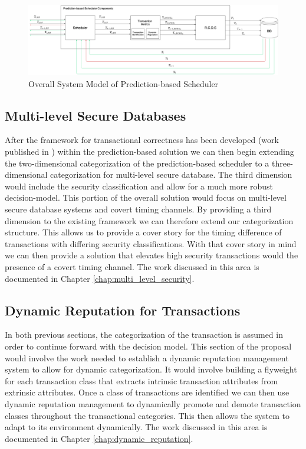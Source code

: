 \begin{figure}[h]
\captionsetup{justification=centering}
\centering
\includegraphics[width=\textwidth]{images/SystemModel_Overall}
\caption{Overall System Model of Prediction-based Scheduler}
\label{fig:system_model_overall}
\end{figure}

\subsection{Multi-level Secure Databases}
After the framework for transactional correctness has been developed (work published in \cite{ravan_ensuring_2020}) within the prediction-based solution we can then begin extending the two-dimensional categorization of the prediction-based scheduler to a three-dimensional categorization for multi-level secure database. The third dimension would include the security classification and allow for a much more robust decision-model. This portion of the overall solution would focus on multi-level secure database systems and covert timing channels. By providing a third dimension to the existing framework we can therefore extend our categorization structure. This allows us to provide a cover story for the timing difference of transactions with differing security classifications. With that cover story in mind we can then provide a solution that elevates high security transactions would the presence of a covert timing channel. The work discussed in this area is documented in Chapter \ref{chap:multi_level_security}.

\subsection{Dynamic Reputation for Transactions}
In both previous sections, the categorization of the transaction is assumed in order to continue forward with the decision model. This section of the proposal would involve the work needed to establish a dynamic reputation management system to allow for dynamic categorization. It would involve building a flyweight for each transaction class that extracts intrinsic transaction attributes from extrinsic attributes. Once a class of transactions are identified we can then use dynamic reputation management to dynamically promote and demote transaction classes throughout the transactional categories. This then allows the system to adapt to its environment dynamically. The work discussed in this area is documented in Chapter \ref{chap:dynamic_reputation}.

